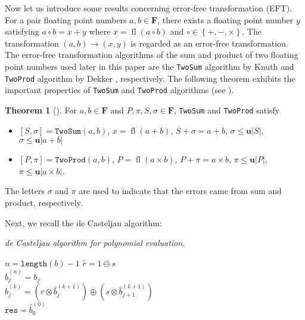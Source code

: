 \documentclass[letterpaper,10pt]{article}
\theoremstyle{definition}
\newtheorem{theorem}{Theorem}
\newcommand{\fl}[1]{\operatorname{fl}\left(#1\right)}
\newcommand{\mach}{\mathbf{u}}
\begin{document}
Now let us introduce some results concerning error-free transformation (EFT).
For a pair floating point numbers \(a, b \in \mathbf{F}\), there exists
a floating point number \(y\) satisfying \(a \circ b = x + y\) where
\(x = \fl{a \circ b}\) and \(\circ \in \left\{+, -, \times\right\}\).
The transformation \((a, b) \longrightarrow (x, y)\) is regarded as an
error-free transformation. The error-free transformation algorithms of the
sum and product of two floating point numbers used later in this paper are
the \texttt{TwoSum} algorithm by Knuth \cite{Knuth1997} and \texttt{TwoProd}
algorithm by Dekker \cite{Dekker1971}, respectively. The following theorem
exhibits the important properties of \texttt{TwoSum} and \texttt{TwoProd}
algorithms (see \cite{Ogita2005}).

\begin{theorem}[\cite{Ogita2005}]
For \(a, b \in \mathbf{F}\) and \(P, \pi, S, \sigma \in \mathbf{F}\),
\texttt{TwoSum} and \texttt{TwoProd} satisfy
\begin{itemize}
  \item \(\left[S, \sigma\right] = \mathtt{TwoSum}(a, b)\), \(x = \fl{a + b}\),
      \(S + \sigma = a + b\), \(\sigma \leq \mach \left|S\right|\),
      \(\sigma \leq \mach \left|a + b\right|\)
  \item \(\left[P, \pi\right] = \mathtt{TwoProd}(a, b)\),
      \(P = \fl{a \times b}\), \(P + \pi = a \times b\),
      \(\pi \leq \mach \left|P\right|\),
      \(\pi \leq \mach \left|a \times b\right|\).
\end{itemize}
The letters \(\sigma\) and \(\pi\) are used to indicate that the
errors came from sum and product, respectively.
\end{theorem}

Next, we recall the de Casteljau algorithm:

\begin{algorithm}[H]
  \caption{\textit{de Casteljau algorithm for polynomial evaluation.}}

  \begin{algorithmic}
      \State \(n = \texttt{length}(b) - 1\)
      \State \(\widehat{r} = 1 \ominus s\)
      \\
        \State \(\widehat{b}_j^{(n)} = b_j\)
      \EndFor
      \\
          \State \(\widehat{b}_j^{(k)} = \left(
              r \otimes \widehat{b}_j^{(k + 1)}\right) \oplus
              \left(s \otimes \widehat{b}_{j + 1}^{(k + 1)}\right)\)
        \EndFor
      \EndFor
      \\
      \State \(\mathtt{res} = \widehat{b}_0^{(0)}\)
    \EndFunction
  \end{algorithmic}
\end{algorithm}
\end{document}
